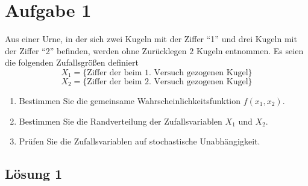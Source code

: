 \documentclass[main.tex]{subfiles}
\begin{document}
\section{Aufgabe 1}
Aus einer Urne, in der sich zwei Kugeln mit der Ziffer "`1"' und drei Kugeln mit der Ziffer "`2"' befinden, werden ohne Zurücklegen $2$ Kugeln entnommen. Es seien die folgenden Zufallsgrößen definiert
$$ X_1 = \{ \mbox{Ziffer der beim 1. Versuch gezogenen Kugel} \} $$ 
$$ X_2 = \{ \mbox{Ziffer der beim 2. Versuch gezogenen Kugel} \} $$ 
\begin{enumerate}
\item Bestimmen Sie die gemeinsame Wahrscheinlichkeitsfunktion $f(x_1, x_2)$.
\item Bestimmen Sie die Randverteilung der Zufallsvariablen $X_1$ und $X_2$. 
\item Prüfen Sie die Zufallsvariablen auf stochastische Unabhängigkeit.
\end{enumerate}

\subsection{Lösung 1}
\end{document}
